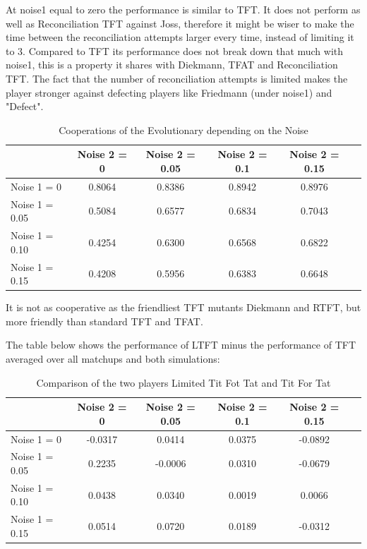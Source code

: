 At noise1 equal to zero the performance is similar to TFT. It does not perform as well as Reconciliation TFT against Joss, therefore it might be wiser to make the time between the reconciliation attempts larger every time, instead of limiting it to 3. Compared to TFT its performance does not break down that much with noise1, this is a property it shares with Diekmann, TFAT and Reconciliation TFT. The fact that the number of reconciliation attempts is limited makes the player stronger against defecting players like Friedmann (under noise1) and "Defect".


\begin{table}[h]
 \begin{center}
\caption{Cooperations of the Evolutionary depending on the Noise} \vspace{3mm}
\begin{tabular}{|l|c|c|c|c|c|}
\hline
   	& Noise 2 = 0 & Noise 2 = 0.05& Noise 2 = 0.1& Noise 2 = 0.15 \\
  \hline
  Noise 1 = 0 	&     0.8064&    0.8386 &   0.8942    &0.8976 \\
 \hline
  Noise 1 = 0.05	 &    0.5084  &  0.6577&    0.6834  &  0.7043\\
 \hline
  Noise 1 = 0.10 	&0.4254  &  0.6300 &   0.6568 &   0.6822 \\
 \hline
  Noise 1 = 0.15 	&    0.4208   & 0.5956  &  0.6383  &  0.6648 \\
 \hline
\end{tabular}
 \end{center}
\end{table}

It is not as cooperative as the friendliest TFT mutants Diekmann and RTFT, but more friendly than standard TFT and TFAT.

The table below shows the performance of LTFT minus the performance of TFT averaged over all matchups and both simulations:

\begin{table}[h]
 \begin{center}
\caption{Comparison of the two players Limited Tit Fot Tat and Tit For Tat} \vspace{3mm}
\begin{tabular}{|l|c|c|c|c|c|}
\hline
   	& Noise 2 = 0 & Noise 2 = 0.05& Noise 2 = 0.1& Noise 2 = 0.15 \\
  \hline
  Noise 1 = 0 	&    -0.0317 &   0.0414 &   0.0375&   -0.0892 \\
 \hline
  Noise 1 = 0.05	 &    0.2235 &  -0.0006  &  0.0310  & -0.0679\\
 \hline
  Noise 1 = 0.10 	&     0.0438&    0.0340  &  0.0019  &  0.0066 \\
 \hline
  Noise 1 = 0.15 	&     0.0514  &  0.0720  &  0.0189 &  -0.0312 \\
 \hline
\end{tabular}
 \end{center}
\end{table}

